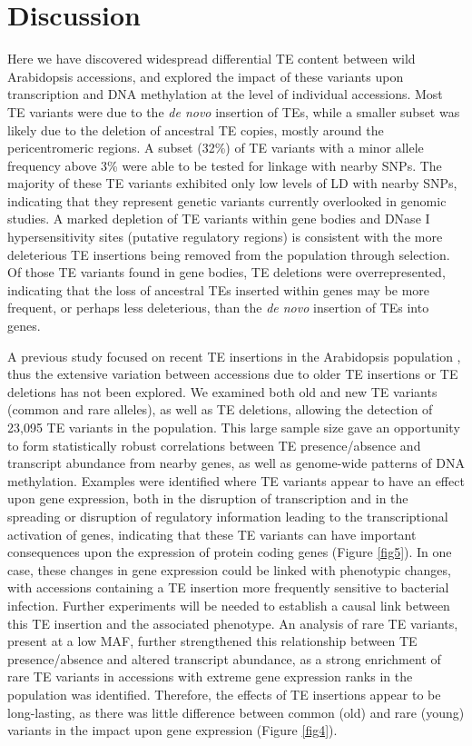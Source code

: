 \documentclass[12pt]{article}
\begin{document}
\section{Discussion}

Here we have discovered widespread differential TE content between wild
Arabidopsis accessions, and explored the impact of these variants upon
transcription and DNA methylation at the level of individual accessions.
Most TE variants were due to the \emph{de novo }insertion of TEs, while
a smaller subset was likely due to the deletion of ancestral TE copies,
mostly around the pericentromeric regions. A subset (32\%) of TE
variants with a minor allele frequency above 3\% were able to be tested
for linkage with nearby SNPs. The majority of these TE variants
exhibited only low levels of LD with nearby SNPs, indicating that they
represent genetic variants currently overlooked in genomic studies. A
marked depletion of TE variants within gene bodies and DNase I
hypersensitivity sites (putative regulatory regions) is consistent with
the more deleterious TE insertions being removed from the population
through selection. Of those TE variants found in gene bodies, TE
deletions were overrepresented, indicating that the loss of ancestral
TEs inserted within genes may be more frequent, or perhaps less
deleterious, than the \emph{de novo }insertion of TEs into genes.

A previous study focused on recent TE insertions in the Arabidopsis
population \cite{Quadrana:2016bi}, thus the extensive variation
between accessions due to older TE insertions or TE deletions has not
been explored. We examined both old and new TE variants (common and
rare alleles), as well as TE deletions, allowing the detection of
23,095 TE variants in the population. This large sample size gave an
opportunity to form statistically robust correlations between TE
presence/absence and transcript abundance from nearby genes, as well
as genome-wide patterns of DNA methylation. Examples were identified
where TE variants appear to have an effect upon gene expression, both
in the disruption of transcription and in the spreading or disruption
of regulatory information leading to the transcriptional activation of
genes, indicating that these TE variants can have important
consequences upon the expression of protein coding genes (Figure
\ref{fig5}). In one case, these changes in gene expression could be
linked with phenotypic changes, with accessions containing a TE
insertion more frequently sensitive to bacterial infection. Further
experiments will be needed to establish a causal link between this TE
insertion and the associated phenotype. An analysis of rare TE
variants, present at a low MAF, further strengthened this relationship
between TE presence/absence and altered transcript abundance, as a
strong enrichment of rare TE variants in accessions with extreme gene
expression ranks in the population was identified.  Therefore, the
effects of TE insertions appear to be long-lasting, as there was
little difference between common (old) and rare (young) variants in
the impact upon gene expression (Figure \ref{fig4}).
\end{document}
